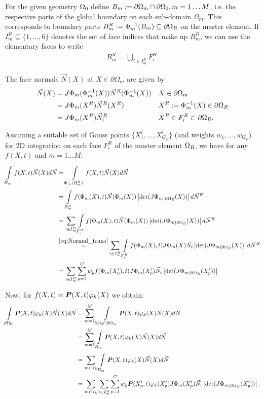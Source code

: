 For the given geometry $\Omega_0$ define $B_m := \partial\Omega_m \cap \partial\Omega_0, m=1\ldots M$, i.e. the respective parts of the global boundary on each sub-domain $\Omega_m$.
This corresponds to boundary parts $B^R_m := \Phi_m^{-1}(B_m) \subseteq \partial \Omega_R$ on the master element.
If $I^R_m \subseteq \{1, \ldots, 6\}$ denotes the set of face indices that make up $B^R_m$, we can use the elementary faces to write
\begin{align*}
	B^R_m = \bigcup_{i\in I^R_m}F_i^R.
\end{align*}

The face normals $\vec{N}(X)$ at $X \in \partial \Omega_m$ are given by
\begin{align}
	\vec{N}(X) &= J\Phi_m(\Phi_m^{-1}(X))\vec{N}^R(\Phi_m^{-1}(X)) && X \in\partial\Omega_m\nonumber\\
			     &= J\Phi_m(X^R)\vec{N}^R(X^R) && X^R := \Phi_m^{-1}(X) \in\partial\Omega_R\nonumber\\
				 &= J\Phi_m(X^R)\vec{N}^R_i && X^R \in F^R_i \subset \partial\Omega_R.\label{eq:Normal_trans}
\end{align}

Assuming a suitable set of Gauss points $\{X_1^i,\ldots,X^i_{G_F}\}$ (and weights $w_1,\ldots,w_{G_F}$)
for 2D integration on each face $F^R_i$ of the master element $\Omega_R$, we have for any $f(X,t)$ and $m = 1\ldots M$:
\begin{align*} %
	\intl{B_m}{} f(X,t)\vec{N}(X)d\vec{N} &= \intl{\Phi_m(B^R_m)}{} f(X,t) \vec{N}(X)d\vec{N}\\
	&=\intl{B^R_m}{} f(\Phi_m(X),t) \vec{N}(\Phi_m(X))\left|\det(J{\Phi_m}_{|\partial\Om}(X))\right|d\vec{N}^R\\
	&=\suml{i\in I^R_m}{} \intl{F^R_i}{} f(\Phi_m(X),t) \vec{N}(\Phi_m(X))\left|\det(J{\Phi_m}_{|\partial\Om}(X))\right|d\vec{N}^R\\
	&\re{eq:Normal_trans}\suml{i\in I^R_m}{} \intl{F^R_i}{} f(\Phi_m(X),t) J\Phi_m(X)\vec{N}_i\left|\det(J{\Phi_m}_{|\partial\Om}(X))\right|d\vec{N}^R\\
	&=\suml{i\in I^R_m}{} \sumgp w_p f(\Phi_m(X^i_p),t) J\Phi_m(X^i_p)\vec{N}_i\left|\det(J{\Phi_m}_{|\partial\Om}(X^i_p))\right|
\end{align*}
 
Now, for $f(X,t) = \boldsymbol{P}(X,t)\varphi_k(X)$ we obtain:
\begin{align*}
	\int\limits_{\partial\Omega_0}^{} \boldsymbol{P}(X,t)\varphi_k(X)\vec{N}(X)d\vec{N} &= \sum\limits_{m=1}^{M} \int\limits_{\partial\Omega_0 \cap \partial\Omega_m}^{}\boldsymbol{P}(X,t)\varphi_k(X) \vec{N}(X)d\vec{N}\\
	&=\sum\limits_{m=1}^{M} \int\limits_{B_m}^{}\boldsymbol{P}(X,t)\varphi_k(X) \vec{N}(X)d\vec{N}\\
	&=\sum\limits_{m\in V_k}^{} \int\limits_{B_m}^{}\boldsymbol{P}(X,t)\varphi_k(X) \vec{N}(X)d\vec{N}\\
	&=\sum\limits_{m\in V_k}^{} \sum\limits_{i\in I^R_m}^{}\sum\limits_{p=1}^{G} w_p \boldsymbol{P}(X_p^i,t)\varphi_k(X_p^i) J\Phi_m(X_p^i)\vec{N}_i\left|\det(J{\Phi_m}_{|\partial\Omega_R}(X_p^i))\right|.
\end{align*}
